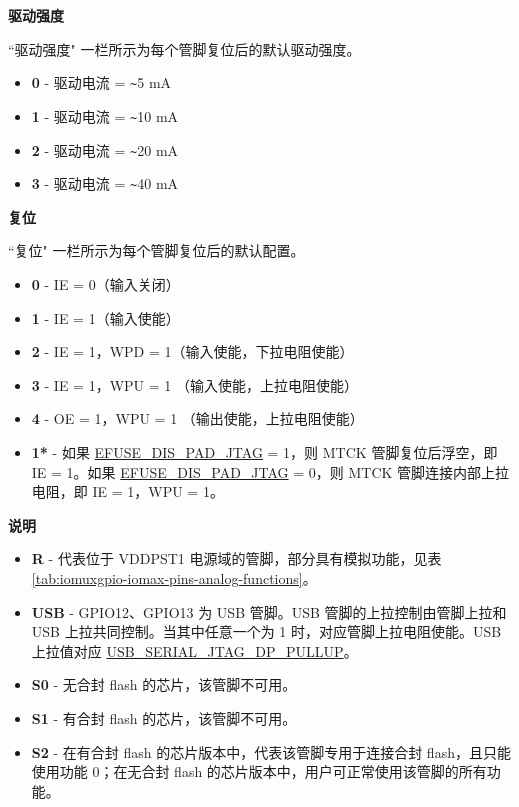 \textbf{驱动强度}

``驱动强度" 一栏所示为每个管脚复位后的默认驱动强度。

\begin{itemize}
\item \textbf{0} - 驱动电流 = \verb+~+5 mA
\item \textbf{1} - 驱动电流 = \verb+~+10 mA
\item \textbf{2} - 驱动电流 = \verb+~+20 mA
\item \textbf{3} - 驱动电流 = \verb+~+40 mA
\end{itemize}

\textbf{复位}

``复位" 一栏所示为每个管脚复位后的默认配置。

\begin{itemize}
\item \textbf{0} - IE = 0（输入关闭）
\item \textbf{1} - IE = 1（输入使能）
\item \textbf{2} - IE = 1，WPD = 1（输入使能，下拉电阻使能）
\item \textbf{3} - IE = 1，WPU = 1 （输入使能，上拉电阻使能）
\item \textbf{4} - OE = 1，WPU = 1 （输出使能，上拉电阻使能）
\item \textbf{1*} - 如果 \hyperref[fielddesc:EFUSEDISPADJTAG]{EFUSE\_DIS\_PAD\_JTAG} = 1，则 MTCK 管脚复位后浮空，即 IE = 1。如果 \hyperref[fielddesc:EFUSEDISPADJTAG]{EFUSE\_DIS\_PAD\_JTAG} = 0，则 MTCK 管脚连接内部上拉电阻，即 IE = 1，WPU = 1。  
\end{itemize}

\textbf{说明}

\begin{itemize}
\item \textbf{R} - 代表位于 VDDPST1 电源域的管脚，部分具有模拟功能，见表 \ref{tab:iomuxgpio-iomax-pins-analog-functions}。
\item \textbf{USB} - GPIO12、GPIO13 为 USB 管脚。USB 管脚的上拉控制由管脚上拉和 USB 上拉共同控制。当其中任意一个为 1 时，对应管脚上拉电阻使能。USB 上拉值对应 \hyperref[fielddesc:USBSERIALJTAGDPPULLUP]{USB\_SERIAL\_JTAG\_DP\_PULLUP}。
\item \textbf{S0} - 无合封 flash 的芯片，该管脚不可用。
\item \textbf{S1} - 有合封 flash 的芯片，该管脚不可用。
\item \textbf{S2} - 在有合封 flash 的芯片版本中，代表该管脚专用于连接合封 flash，且只能使用功能 0；在无合封 flash 的芯片版本中，用户可正常使用该管脚的所有功能。
\end{itemize}
